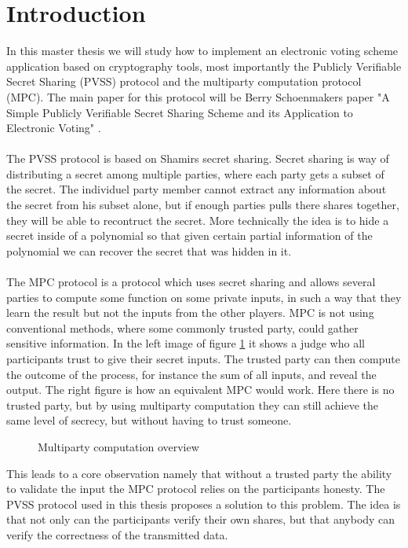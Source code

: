 \section{Introduction}
In this master thesis we will study how to implement an  electronic voting scheme application based on cryptography tools, most importantly the Publicly Verifiable Secret Sharing (PVSS) protocol and the multiparty computation protocol (MPC). The main paper for this protocol will be Berry Schoenmakers paper "A Simple Publicly Verifiable Secret Sharing Scheme and its Application to Electronic Voting" \cite{Schoenmakers1999}. \\\\
\noindent
The PVSS protocol is based on Shamirs secret sharing. Secret sharing is way
of distributing a secret among multiple parties, where each party gets a subset of the secret. The individuel party member cannot extract any information about the secret from his subset alone, but if enough parties pulls there shares together, they will be able to recontruct the secret. More technically the idea is to hide a secret inside of a polynomial so that given certain partial information of the polynomial we can recover the secret that was hidden in it.\\\\
\noindent
The MPC protocol is a protocol which uses secret sharing and allows several parties to compute some function on some private inputs, in such a way that they learn the result but not the inputs from the other players. MPC is not using conventional methods, where some commonly trusted party, could gather sensitive information. In the left image of figure \ref{fig:MPC_Overview} it shows a judge who all participants trust to give their secret inputs. The trusted party can then compute the outcome of the process, for instance the sum of all inputs, and reveal the output. The right figure is how an equivalent MPC would work. Here there is no trusted party, but by using multiparty computation they can still achieve the same level of secrecy, but without having to trust someone.

\begin{figure}[H]
    \centering
    \caption{Multiparty computation overview}
    \label{fig:MPC_Overview}
\end{figure} 

\noindent
This leads to a core observation namely that without a trusted party the ability to validate the input the MPC protocol relies on the participants honesty. 
The PVSS protocol used in this thesis proposes a solution to this problem. The idea is that not only can the participants verify their own shares, but that anybody can verify the correctness of the transmitted data.